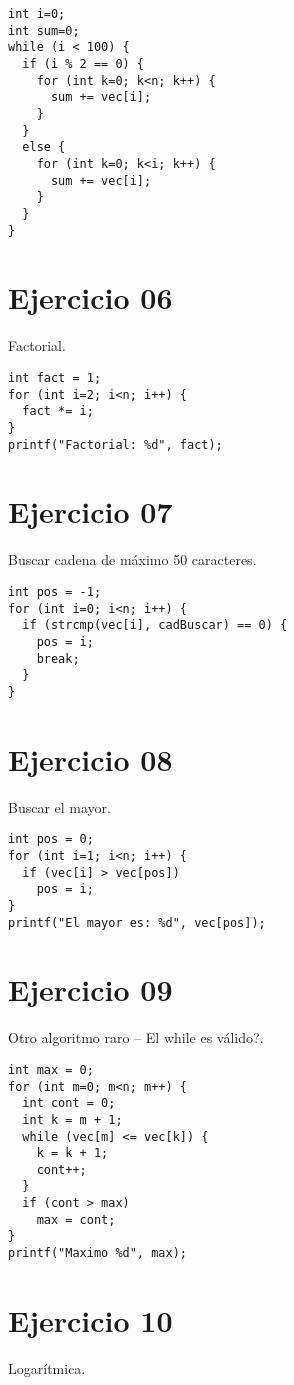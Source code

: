 \documentclass{article}
\begin{document}
\begin{lstlisting}
int i=0;
int sum=0;
while (i < 100) {
  if (i % 2 == 0) {
    for (int k=0; k<n; k++) {
      sum += vec[i];
    }
  }
  else {
    for (int k=0; k<i; k++) {
      sum += vec[i];
    }
  }
}
\end{lstlisting}

\section{Ejercicio 06}
Factorial.

\begin{lstlisting}
int fact = 1;
for (int i=2; i<n; i++) {
  fact *= i;
}
printf("Factorial: %d", fact);
\end{lstlisting}

\section{Ejercicio 07}
Buscar cadena de máximo 50 caracteres.

\begin{lstlisting}
int pos = -1;
for (int i=0; i<n; i++) {
  if (strcmp(vec[i], cadBuscar) == 0) {
    pos = i;
    break;
  }
}
\end{lstlisting}

\section{Ejercicio 08}
Buscar el mayor.

\begin{lstlisting}
int pos = 0;
for (int i=1; i<n; i++) {
  if (vec[i] > vec[pos])
    pos = i;
}
printf("El mayor es: %d", vec[pos]); 
\end{lstlisting}

\section{Ejercicio 09}
Otro algoritmo raro – El while es válido?.

\begin{lstlisting}
int max = 0;
for (int m=0; m<n; m++) {
  int cont = 0;
  int k = m + 1;
  while (vec[m] <= vec[k]) {
    k = k + 1;
    cont++;
  }
  if (cont > max)
    max = cont;
}
printf("Maximo %d", max);
\end{lstlisting}

\section{Ejercicio 10}
Logarítmica.
\end{document}
